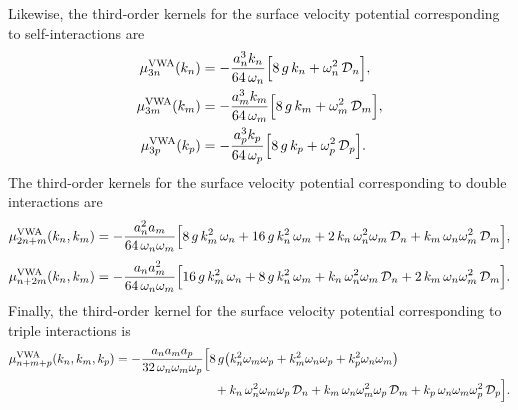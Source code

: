 \documentclass[lineno]{JFM-FLM_Au}
\begin{document}
\begin{appen}
Likewise, the third-order kernels for the surface velocity potential corresponding to self-interactions are
\begin{equation}
\begin{aligned}
  \mu_{3n}^{\mathrm{VWA}}(k_n)
  &= -\frac{a_n^{3} k_n}{64\,\omega_n}\Bigl[8\,g\,k_n + \omega_n^{2}\,\mathcal{D}_n\Bigr], \\
  \mu_{3m}^{\mathrm{VWA}}(k_m)
  &= -\frac{a_m^{3} k_m}{64\,\omega_m}\Bigl[8\,g\,k_m + \omega_m^{2}\,\mathcal{D}_m\Bigr], \\
  \mu_{3p}^{\mathrm{VWA}}(k_p)
  &= -\frac{a_p^{3} k_p}{64\,\omega_p}\Bigl[8\,g\,k_p + \omega_p^{2}\,\mathcal{D}_p\Bigr].
\end{aligned}
\end{equation}
The third-order kernels for the surface velocity potential corresponding to double interactions are
\begin{equation}
\begin{aligned}
\mu_{2n+m}^{\mathrm{VWA}}(k_n,k_m)
&= -\frac{a_n^{2} a_m}{64\,\omega_n \omega_m} 
   \Bigl[
       8\,g\,k_m^{2}\,\omega_n
     + 16\,g\,k_n^{2}\,\omega_m
     + 2\,k_n\,\omega_n^{2}\omega_m\,\mathcal{D}_n
     + k_m\,\omega_n \omega_m^{2}\,\mathcal{D}_m
   \Bigr],\\[1mm]
\mu_{n+2m}^{\mathrm{VWA}}(k_n,k_m)
&= -\frac{a_n a_m^{2}}{64\,\omega_n \omega_m} 
   \Bigl[
       16\,g\,k_m^{2}\,\omega_n
     + 8\,g\,k_n^{2}\,\omega_m
     + k_n\,\omega_n^{2}\omega_m\,\mathcal{D}_n
     + 2\,k_m\,\omega_n \omega_m^{2}\,\mathcal{D}_m
   \Bigr].
\end{aligned}
\end{equation}
Finally, the third-order kernel for the surface velocity potential corresponding to triple interactions is
\begin{equation}
\begin{aligned}
  \mu_{n+m+p}^{\mathrm{VWA}}(k_n,k_m,k_p)
  &= -\frac{a_n a_m a_p}{32\,\omega_n\omega_m\omega_p}\Bigl[
      8\,g\bigl(
        k_n^{2}\omega_m\omega_p
      + k_m^{2}\omega_n\omega_p
      + k_p^{2}\omega_n\omega_m
      \bigr)\\
  &\qquad\qquad\qquad\qquad
    + k_n\,\omega_n^{2}\omega_m\omega_p\,\mathcal{D}_n
    + k_m\,\omega_n\omega_m^{2}\omega_p\,\mathcal{D}_m
    + k_p\,\omega_n\omega_m\omega_p^{2}\,\mathcal{D}_p
  \Bigr].
\end{aligned}
\end{equation}


\end{appen}
\end{document}
